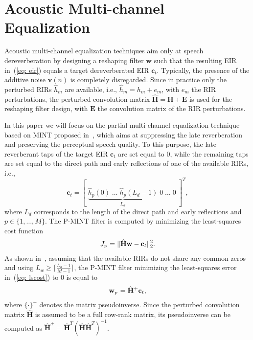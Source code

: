 \documentclass[draftcls,onecolumn,11pt]{IEEEtran}
\begin{document}
\section{Acoustic Multi-channel Equalization}
\label{sec: eq}
Acoustic multi-channel equalization techniques aim only at speech dereverberation by designing a reshaping filter $\mathbf{w}$ such that the resulting EIR in~(\ref{eq: eir}) equals a target dereverberated EIR $\mathbf{c}_t$.
Typically, the presence of the additive noise $\mathbf{v}(n)$ is completely disregarded.
Since in practice only the perturbed RIRs $\hat{h}_m$ are available, i.e., $\hat{h}_m = h_m + e_m$, with $e_m$ the RIR perturbations, the perturbed convolution matrix $\hat{\mathbf{H}} = \mathbf{H} + \mathbf{E}$ is used for the reshaping filter design, with $\mathbf{E}$ the convolution matrix of the RIR perturbations.

In this paper we will focus on the partial multi-channel equalization technique based on MINT proposed in~\cite{Kodrasi_ITASLP_2013}, which aims at suppressing the late reverberation and preserving the perceptual speech quality.
To this purpose, the late reverberant taps of the target EIR $\mathbf{c}_t$ are set equal to $0$, while the remaining taps are set equal to the direct path and early reflections of one of the available RIRs, i.e.,
\begin{equation}
\label{eq: ct}
\mathbf{c}_t = [\; \underbrace{\hat{h}_p(0) \; \ldots \; \hat{h}_p(L_d-1)}_{L_d} \; 0 \; \ldots \; 0 \; ]^{T},
\end{equation}
where $L_d$ corresponds to the length of the direct path and early reflections and $p \in \{1, \ldots, M \}$.
The P-MINT filter is computed by minimizing the least-squares cost function
\begin{equation}
\label{eq: lscost}
J_{_{\rm P}} = \|\hat{\mathbf{H}}\mathbf{w} - \mathbf{c}_t \|_2^2.
\end{equation}
As shown in~\cite{Miyoshi_ITASS_1988}, assuming that the available RIRs do not share any common zeros and using $L_w \geq \lceil{\frac{L_h-1}{M-1}\rceil}$, the P-MINT filter minimizing the least-squares error in~(\ref{eq: lscost}) to 0 is equal to
\begin{equation}
\label{eq: lssol}
\mathbf{w}_{_{\rm P}} = \hat{\mathbf{H}}^+\mathbf{c}_t,
\end{equation}
where $\{\cdot \}^+$ denotes the matrix pseudoinverse.
Since the perturbed convolution matrix $\hat{\mathbf{H}}$ is assumed to be a full row-rank matrix, its pseudoinverse can be computed as $\hat{\mathbf{H}}^+ = \hat{\mathbf{H}}^T(\hat{\mathbf{H}}\hat{\mathbf{H}}^T)^{-1}$.
\end{document}
